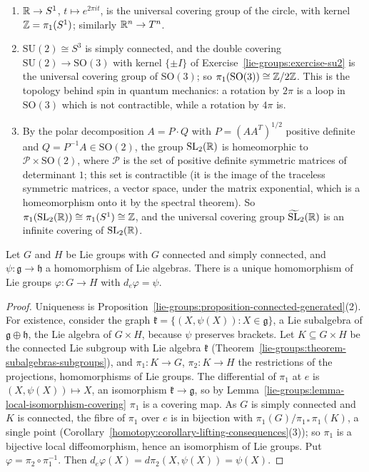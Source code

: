 \begin{example}\label{lie-groups:example-covering-groups}
\begin{enumerate}
\item $\mathbb{R} \to S^1$, $t \mapsto e^{2\pi it}$, is the universal covering group of the circle, with kernel $\mathbb{Z} = \pi_1(S^1)$; similarly $\mathbb{R}^n \to T^n$.
\item $\mathrm{SU}(2) \cong S^3$ is simply connected, and the double covering $\mathrm{SU}(2) \to \mathrm{SO}(3)$ with kernel $\{\pm I\}$ of
Exercise~\ref{lie-groups:exercise-su2} is the universal covering group of $\mathrm{SO}(3)$; so $\pi_1(\mathrm{SO}(3)) \cong \mathbb{Z}/2\mathbb{Z}$. This is the topology behind spin in quantum mechanics: a rotation by $2\pi$ is a loop in
$\mathrm{SO}(3)$ which is not contractible, while a rotation by $4\pi$ is.
\item By the polar decomposition $A = P \cdot Q$ with $P = (AA^T)^{1/2}$ positive definite and $Q = P^{-1}A \in \mathrm{SO}(2)$, the group $\mathrm{SL}_2(\mathbb{R})$ is homeomorphic
to $\mathcal{P} \times \mathrm{SO}(2)$, where $\mathcal{P}$ is the set of positive definite symmetric matrices of determinant $1$; this set is contractible (it is the
image of the traceless symmetric matrices, a vector space, under the matrix exponential, which is a homeomorphism onto it by the spectral theorem). So
$\pi_1(\mathrm{SL}_2(\mathbb{R})) \cong \pi_1(S^1) \cong \mathbb{Z}$, and the universal covering group $\widetilde{\mathrm{SL}}_2(\mathbb{R})$ is an infinite covering of $\mathrm{SL}_2(\mathbb{R})$.
\end{enumerate}
\end{example}

\begin{theorem}\label{lie-groups:theorem-integrate-homomorphisms}
Let $G$ and $H$ be Lie groups with $G$ connected and simply connected, and $\psi \colon \mathfrak{g} \to \mathfrak{h}$ a homomorphism of Lie algebras. There is a unique
homomorphism of Lie groups $\varphi \colon G \to H$ with $d_e\varphi = \psi$.
\end{theorem}

\begin{proof}
Uniqueness is Proposition~\ref{lie-groups:proposition-connected-generated}(2). For existence, consider the graph $\mathfrak{k} = \{(X, \psi(X)) : X \in \mathfrak{g}\}$, a
Lie subalgebra of $\mathfrak{g} \oplus \mathfrak{h}$, the Lie algebra of $G \times H$, because $\psi$ preserves brackets. Let $K \subseteq G \times H$ be the connected Lie
subgroup with Lie algebra $\mathfrak{k}$ (Theorem~\ref{lie-groups:theorem-subalgebras-subgroups}), and $\pi_1 \colon K \to G$, $\pi_2 \colon K \to H$ the restrictions of
the projections, homomorphisms of Lie groups. The differential of $\pi_1$ at $e$ is $(X, \psi(X)) \mapsto X$, an isomorphism $\mathfrak{k} \to \mathfrak{g}$, so by
Lemma~\ref{lie-groups:lemma-local-isomorphism-covering} $\pi_1$ is a covering map. As $G$ is simply connected and $K$ is connected, the fibre of $\pi_1$ over $e$ is in
bijection with $\pi_1(G)/\pi_{1*}\pi_1(K)$, a single point (Corollary~\ref{homotopy:corollary-lifting-consequences}(3)); so $\pi_1$ is a bijective local diffeomorphism,
hence an isomorphism of Lie groups. Put $\varphi = \pi_2 \circ \pi_1^{-1}$. Then $d_e\varphi(X) = d\pi_2(X, \psi(X)) = \psi(X)$.
\end{proof}

